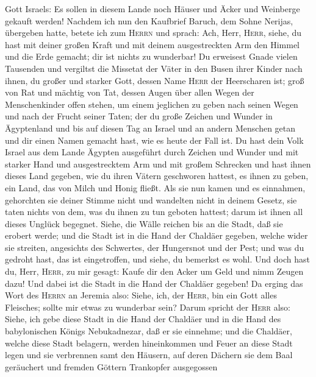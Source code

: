 Gott Israels: Es sollen in diesem Lande noch Häuser und Äcker und
Weinberge gekauft werden!  Nachdem ich nun den Kaufbrief
Baruch, dem Sohne Nerijas, übergeben hatte, betete ich zum
\textsc{Herrn} und sprach:  Ach, Herr, \textsc{Herr},
siehe, du hast mit deiner großen Kraft und mit deinem ausgestreckten Arm
den Himmel und die Erde gemacht; dir ist nichts zu wunderbar!
 Du erweisest Gnade vielen Tausenden und vergiltst die
Missetat der Väter in den Busen ihrer Kinder nach ihnen, du großer und
starker Gott, dessen Name \textsc{Herr} der Heerscharen ist;
 groß von Rat und mächtig von Tat, dessen Augen über
allen Wegen der Menschenkinder offen stehen, um einem jeglichen zu geben
nach seinen Wegen und nach der Frucht seiner Taten;  der
du große Zeichen und Wunder in Ägyptenland und bis auf diesen Tag an
Israel und an andern Menschen getan und dir einen Namen gemacht hast,
wie es heute der Fall ist.  Du hast dein Volk Israel aus
dem Lande Ägypten ausgeführt durch Zeichen und Wunder und mit starker
Hand und ausgestrecktem Arm und mit großem Schrecken  und
hast ihnen dieses Land gegeben, wie du ihren Vätern geschworen hattest,
es ihnen zu geben, ein Land, das von Milch und Honig fließt.
 Als sie nun kamen und es einnahmen, gehorchten sie
deiner Stimme nicht und wandelten nicht in deinem Gesetz, sie taten
nichts von dem, was du ihnen zu tun geboten hattest; darum ist ihnen all
dieses Unglück begegnet.  Siehe, die Wälle reichen bis an
die Stadt, daß sie erobert werde; und die Stadt ist in die Hand der
Chaldäer gegeben, welche wider sie streiten, angesichts des Schwertes,
der Hungersnot und der Pest; und was du gedroht hast, das ist
eingetroffen, und siehe, du bemerkst es wohl.  Und doch
hast du, Herr, \textsc{Herr}, zu mir gesagt: Kaufe dir den Acker um Geld
und nimm Zeugen dazu! Und dabei ist die Stadt in die Hand der Chaldäer
gegeben!  Da erging das Wort des \textsc{Herrn} an
Jeremia also:  Siehe, ich, der \textsc{Herr}, bin ein
Gott alles Fleisches; sollte mir etwas zu wunderbar sein?
 Darum spricht der \textsc{Herr} also: Siehe, ich gebe
diese Stadt in die Hand der Chaldäer und in die Hand des babylonischen
Königs Nebukadnezar, daß er sie einnehme;  und die
Chaldäer, welche diese Stadt belagern, werden hineinkommen und Feuer an
diese Stadt legen und sie verbrennen samt den Häusern, auf deren Dächern
sie dem Baal geräuchert und fremden Göttern Trankopfer ausgegossen
